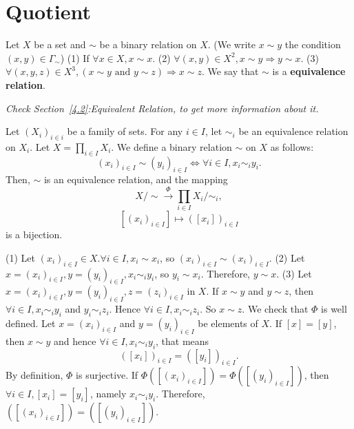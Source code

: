 \documentclass{book}
\numberwithin{equation}{section}
\begin{document}
\section{Quotient}\label{5.5}
\begin{definitionenv}
    Let $X$ be a set and $\sim$ be a binary relation on $X$. (We write $x\sim y$ the condition $(x, y)\in \Gamma_\sim$)
    \newline
    (1) If $\forall x\in X,  x\sim x$.
    \newline
    (2) $\forall (x, y)\in X^2,  x\sim y\Rightarrow y\sim x$.
    \newline
    (3) $\forall (x, y, z)\in X^3,  (x\sim y \text{ and } y\sim z )\Rightarrow x\sim z$.
    \newline
    We say that $\sim $ is a \textbf{equivalence relation}.
\end{definitionenv}
\textit{Check Section~\ref{4.2}:Equivalent Relation,  to get more information about it.}
\begin{propositionenv}
    Let $(X_i)_{i\in i}$ be a family of sets. For any $i\in I$,  let $\sim_i$ be an equivalence relation on $X_i$. Let $X=\prod_{i\in I}X_i$. We define a binary relation $\sim$ on $X$ as follows:
    $$(x_i)_{i\in I}\sim (y_i)_{i\in I}\Leftrightarrow \forall i\in I,  x_i\sim_i y_i.$$
    Then,  $\sim $ is an equivalence relation,  and the mapping
    $$X/\sim \overset{\Phi}{\longrightarrow }\prod_{i\in I}X_i/\sim_i, $$
    $$ [(x_i)_{i\in I}]\longmapsto  ([x_i])_{i\in I}$$
    is a bijection.
\end{propositionenv}
\begin{proofenv}
    \quad
    \newline
    (1) Let $(x_i)_{i\in I}\in X. \forall i\in I, x_i\sim x_i$,  so $(x_i)_{i\in I}\sim(x_i)_{i\in I}$.
    \newline
    (2) Let $x=(x_i)_{i\in I}, y=(y_i)_{i\in I},  x_i\sim_i y_i$,  so $y_i\sim x_i$. Therefore,  $y\sim x$.
    \newline 
    (3) Let $x=(x_i)_{i\in I}, y=(y_i)_{i\in I}, z=(z_i)_{i\in I}$ in $X$. If $x\sim y$ and $y\sim z$,  then $\forall i \in I, x_i\sim_i y_i$ and $y_i\sim_i z_i$. Hence $\forall i \in I,  x_i\sim_i z_i$. So $x\sim z$.
    \newline
    We check that $\Phi$ is well defined. Let $x=(x_i)_{i\in I}$ and $y=(y_i)_{i\in I}$ be elements of $X$. If $[x]=[y]$,  then $x\sim y$ and hence $\forall i\in I,  x_i\sim_i y_i$,  that means 
    $$([x_i])_{i\in I}=([y_i])_{i\in I}.$$
    By definition,  $\Phi$ is surjective. If $\Phi([(x_i)_{i\in I}])=\Phi([(y_i)_{i\in I}])$,  then $\forall i\in I,  [x_i]=[y_i]$,  namely $x_i\sim_i y_i$. Therefore,  $([(x_i)_{i\in I}])=([(y_i)_{i\in I}])$.
\end{proofenv}
\end{document}
